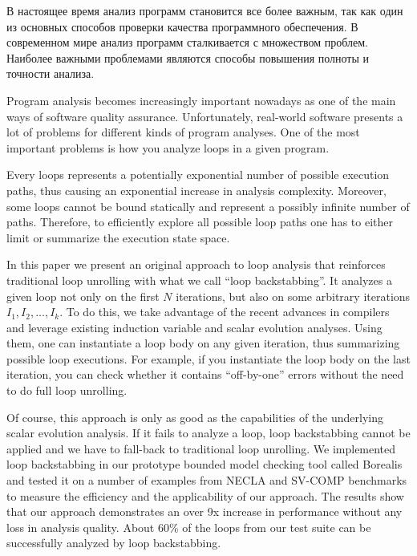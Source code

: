 \intro
В настоящее время анализ программ становится все более важным, так как один из основных способов проверки качества программного обеспечения. В современном мире анализ программ сталкивается с множеством проблем.  Наиболее важными проблемами являются способы повышения полноты и точности анализа.

Program analysis becomes increasingly important nowadays as one of the main
ways of software quality assurance. Unfortunately, real-world software
presents a lot of problems for different kinds of program analyses.
One of the most important problems is how you analyze loops in a given program.

Every loops represents a potentially exponential number of possible execution
paths, thus causing an exponential increase in analysis complexity. Moreover,
some loops cannot be bound statically and represent a possibly infinite number
of paths. Therefore, to efficiently explore all possible loop paths one has
to either limit or summarize the execution state space.

In this paper we present an original approach to loop analysis that reinforces
traditional loop unrolling with what we call ``loop backstabbing''. It analyzes
a given loop not only on the first $N$ iterations, but also on some arbitrary
iterations $I_1, I_2, \ldots, I_k$. To do this, we take advantage of the recent
advances in compilers and leverage existing induction variable and scalar
evolution analyses. Using them, one can instantiate a loop body on any given
iteration, thus summarizing possible loop executions. For example, if you
instantiate the loop body on the last iteration, you can check whether it
contains ``off-by-one'' errors without the need to do full loop unrolling.

Of course, this approach is only as good as the capabilities of the underlying
scalar evolution analysis. If it fails to analyze a loop, loop backstabbing
cannot be applied and we have to fall-back to traditional loop unrolling.
We implemented loop backstabbing in our prototype bounded model checking tool
called Borealis and tested it on a number 
of examples from NECLA and SV-COMP
benchmarks to measure the efficiency and the applicability of our approach.
The results show that our approach demonstrates an over 9x increase in
performance without any loss in analysis quality. About 60\% of the loops
from our test suite can be successfully analyzed by loop backstabbing.
